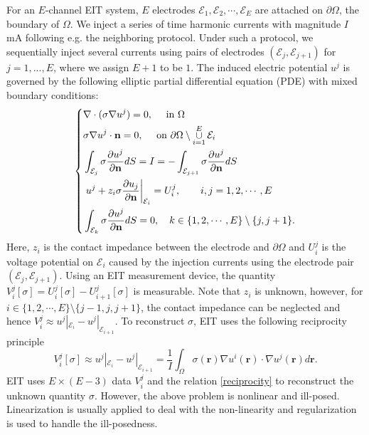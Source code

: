 \documentclass[lettersize,journal]{IEEEtran}
\def\r{\mathbf{r}}
\def\mE{{\mathcal E}}
\def\Om{\Omega}
\begin{document}
For an $E$-channel EIT system, $E$ electrodes $\mathcal{E}_1, \mathcal{E}_2, \cdots, \mathcal{E}_E$ are attached on $\partial \Omega$, the boundary of $\Omega$. We inject a series of time harmonic currents with magnitude $I$ mA following e.g. the neighboring protocol. Under such a protocol, we sequentially inject several currents using pairs of electrodes $(\mE_j,\mE_{j+1})$ for $j=1,...,E$, where we assign $E+1$ to be $1$.
The induced electric potential $u^{j}$ is governed by the following elliptic partial differential equation (PDE) with mixed boundary conditions:
\begin{equation}\label{forward}
  \left\{
    \begin{split}
       & \nabla\cdot(\sigma\nabla u^{j})=0,\quad \mbox{ in }  \Omega \\
       & \sigma\nabla u^j\cdot \mathbf{n}=0, \quad \mbox{ on }  {\partial \Om \setminus \mathop{\cup}\limits_{i=1}^{E}\mE_i} \\
       & \int_{\mathcal{E}_j} \sigma \frac{\partial u^j}{\partial {\bf n}}dS = I = -\int_{\mathcal{E}_{j+1}} \sigma \frac{\partial u^{j}}{\partial {\bf n}}dS \\
       & \left. u^j + z_i \sigma\frac{\partial u_j}{\partial {\bf n}}\right|_{\mE_i} = U^j_i,\qquad i, j=1,2,\cdots,E \\
       & \int_{\mathcal{E}_k} \sigma \frac{\partial u^j}{\partial {\bf n}}dS = 0 ,\quad k\in \{1,2,\cdots,E\}\setminus \{j,j+1\}.
    \end{split}
  \right.
\end{equation}
Here, $z_i$ is the contact impedance between the electrode and $\partial \Omega$ and $U_i^j$ is the voltage potential on $\mE_i$ caused by the injection currents using the electrode pair $(\mE_j,\mE_{j+1})$. Using an EIT measurement device, the quantity $V_i^j[\sigma] = U_{i}^j[\sigma] - U_{i+1}^j[\sigma]$ is measurable.
Note that $z_i$ is unknown, however, for $i\in \{1,2,\cdots,E\}\setminus \{j-1,j,j+1\}$, the contact impedance can be neglected \cite{Lee2018} and hence $V_i^j \approx u^j|_{\mE_i} - u^j|_{\mE_{i+1}}$. To reconstruct $\sigma$, EIT uses the following reciprocity principle
\begin{equation}\label{reciprocity}
  V_i^j[\sigma] \approx u^j|_{\mE_i} - u^j|_{\mE_{i+1}} =\frac{1}{I}\int_\Om \sigma(\r) \nabla u^i(\r) \cdot \nabla u^j(\r)d\r.
\end{equation}
EIT uses $E\times (E-3)$ data $V_i^j$ and the relation \eqref{reciprocity} to reconstruct the unknown quantity $\sigma$. However, the above problem is nonlinear and ill-posed. Linearization is usually applied to deal with the non-linearity and regularization is used to handle the ill-posedness.
\end{document}
